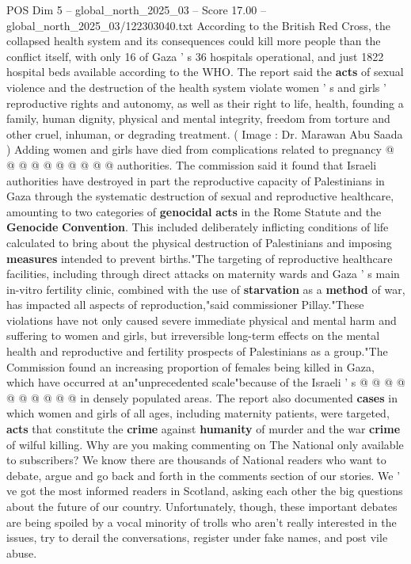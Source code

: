 \begin{textsample}{POS Dim 5 – global\_north\_2025\_03 – Score 17.00 – global\_north\_2025\_03/122303040.txt}
According to the British Red Cross, the collapsed health system and its consequences could kill more people than the conflict itself, with only 16 of Gaza ' s 36 hospitals operational, and just 1822 hospital beds available according to the WHO.
The report said the \textbf{acts} of sexual violence and the destruction of the health system violate women ' s and girls ' reproductive rights and autonomy, as well as their right to life, health, founding a family, human dignity, physical and mental integrity, freedom from torture and other cruel, inhuman, or degrading treatment. ( Image : Dr.
Marawan Abu Saada ) Adding women and girls have died from complications related to pregnancy @ @ @ @ @ @ @ @ @ @ authorities.
The commission said it found that Israeli authorities have destroyed in part the reproductive capacity of Palestinians in Gaza through the systematic destruction of sexual and reproductive healthcare, amounting to two categories of \textbf{genocidal} \textbf{acts} in the Rome Statute and the \textbf{Genocide} \textbf{Convention}.
This included deliberately inflicting conditions of life calculated to bring about the physical destruction of Palestinians and imposing \textbf{measures} intended to prevent births."The targeting of reproductive healthcare facilities, including through direct attacks on maternity wards and Gaza ' s main in-vitro fertility clinic, combined with the use of \textbf{starvation} as a \textbf{method} of war, has impacted all aspects of reproduction,"said commissioner Pillay."These violations have not only caused severe immediate physical and mental harm and suffering to women and girls, but irreversible long-term effects on the mental health and reproductive and fertility prospects of Palestinians as a group."The Commission found an increasing proportion of females being killed in Gaza, which have occurred at an"unprecedented scale"because of the Israeli ' s @ @ @ @ @ @ @ @ @ @ in densely populated areas.
The report also documented \textbf{cases} in which women and girls of all ages, including maternity patients, were targeted, \textbf{acts} that constitute the \textbf{crime} against \textbf{humanity} of murder and the war \textbf{crime} of wilful killing.
Why are you making commenting on The National only available to subscribers?
We know there are thousands of National readers who want to debate, argue and go back and forth in the comments section of our stories.
We ' ve got the most informed readers in Scotland, asking each other the big questions about the future of our country.
Unfortunately, though, these important debates are being spoiled by a vocal minority of trolls who aren't really interested in the issues, try to derail the conversations, register under fake names, and post vile abuse.

\end{textsample}
